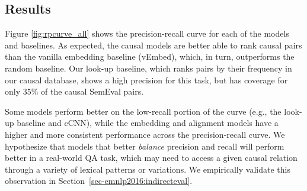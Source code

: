 \subsection{Results}
\label{sec-emnlp2016:results}

Figure \ref{fig:rpcurve_all} shows the precision-recall curve for each of the models and baselines. 
As expected, the causal models are better able to rank causal pairs than the vanilla embedding baseline (vEmbed), which, in turn, outperforms the random baseline.  Our look-up baseline, which ranks pairs by their frequency in our causal database, shows a high precision for this task, but has coverage for only 35\% of the causal SemEval pairs.
%

Some models perform better on the low-recall portion of the curve (e.g., the look-up baseline and cCNN), while the embedding and alignment models have a higher and more consistent performance across the precision-recall curve. We hypothesize that models that better \emph{balance} precision and recall will perform better in a real-world QA task, which may need to access a given causal relation through a variety of lexical patterns or variations. We empirically validate this observation in Section~\ref{sec-emnlp2016:indirecteval}.






